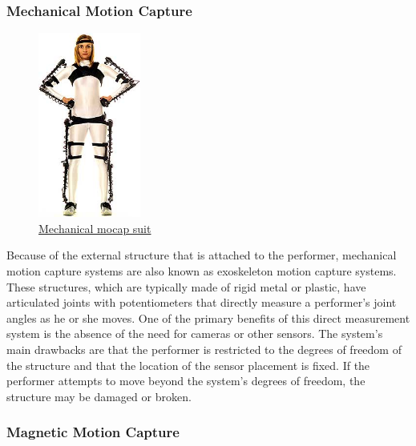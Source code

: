 \pagebreak

\subsubsection*{Mechanical Motion Capture}

\begin{figure}[h]
	\centering
	\includegraphics[width=0.3\textwidth]{figures/background/Mechanical.png}
	\captionsetup{labelformat=empty}
	\caption{\href{https://metamotion.com/images/gypsy4_standing.jpg}
	{Mechanical mocap suit}}
\end{figure}

Because of the external structure \cite{MOTION CAPTURE TO BUILD A FOUNDATION FOR A COMPUTER-CONTROLLED INSTRUMENT BY STUDY OF CLASSICAL GUITAR PERFORMANCE} that is attached to the performer, mechanical motion capture systems are also known as exoskeleton motion capture systems. These structures, which are typically made of rigid metal or plastic, have articulated joints with potentiometers that directly measure a performer's joint angles as he or she moves. One of the primary benefits of this direct measurement system is the absence of the need for cameras or other sensors. The system's main drawbacks are that the performer is restricted to the degrees of freedom of the structure and that the location of the sensor placement is fixed. If the performer attempts to move beyond the system's degrees of freedom, the structure may be damaged or broken.

\pagebreak

\subsubsection*{Magnetic Motion Capture}

